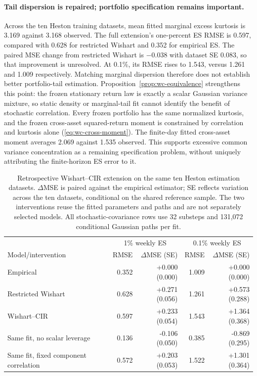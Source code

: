 \documentclass[11pt]{article}
\theoremstyle{definition}\newtheorem{definition}[theorem]{Definition}
\theoremstyle{remark}\newtheorem{remark}[theorem]{Remark}
\begin{document}
\paragraph{Tail dispersion is repaired; portfolio specification remains important.}
Across the ten Heston training datasets, mean fitted marginal excess kurtosis is 3.169 against 3.168 observed. The full extension's one-percent ES RMSE is 0.597, compared with 0.628 for restricted Wishart and 0.352 for empirical ES. The paired MSE change from restricted Wishart is $-0.038$ with dataset SE 0.083, so that improvement is unresolved. At 0.1\%, its RMSE rises to 1.543, versus 1.261 and 1.009 respectively. Matching marginal dispersion therefore does not establish better portfolio-tail estimation. Proposition~\ref{prop:wc-equivalence} strengthens this point: the frozen stationary return law is exactly a scalar Gaussian variance mixture, so static density or marginal-tail fit cannot identify the benefit of stochastic correlation. Every frozen portfolio has the same normalized kurtosis, and the frozen cross-asset squared-return moment is constrained by correlation and kurtosis alone (\ref{eq:wc-cross-moment}). The finite-day fitted cross-asset moment averages 2.069 against 1.535 observed. This supports excessive common variance concentration as a remaining specification problem, without uniquely attributing the finite-horizon ES error to it.
\begin{table}[htbp]
\centering\small
\begin{tabular}{lrrrr}
\toprule
 & \multicolumn{2}{c}{1\% weekly ES} & \multicolumn{2}{c}{0.1\% weekly ES} \\
Model/intervention & RMSE & $\Delta$MSE (SE) & RMSE & $\Delta$MSE (SE) \\
\midrule
Empirical & 0.352 & +0.000 (0.000) & 1.009 & +0.000 (0.000) \\
Restricted Wishart & 0.628 & +0.271 (0.056) & 1.261 & +0.573 (0.288) \\
Wishart--CIR & 0.597 & +0.233 (0.054) & 1.543 & +1.364 (0.368) \\
Same fit, no scalar leverage & 0.136 & -0.106 (0.050) & 0.385 & -0.869 (0.295) \\
Same fit, fixed component correlation & 0.572 & +0.203 (0.053) & 1.522 & +1.301 (0.364) \\
\bottomrule
\end{tabular}
\caption{Retrospective Wishart--CIR extension on the same ten Heston estimation datasets. $\Delta$MSE is paired against the empirical estimator; SE reflects variation across the ten datasets, conditional on the shared reference sample. The two interventions reuse the fitted parameters and paths and are not separately selected models. All stochastic-covariance rows use 32 substeps and 131,072 conditional Gaussian paths per fit.}\label{tab:wc-synthetic}
\end{table}
\end{document}
